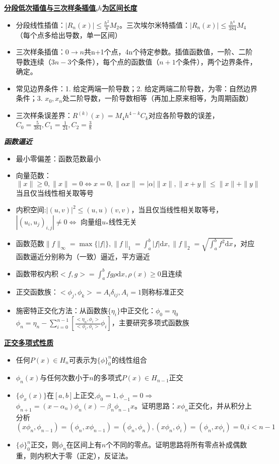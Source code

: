\documentclass[UTF8,a4paper,landscape,compress]{paper}
\renewcommand{\subsection}[1]{{\small\textbf{\underline{#1}}}\\ }
\renewcommand{\section}[1]{{\normalsize\textbf{\emph{#1}}}\\ }
\newcommand{\List}[1]{\begin{itemize}[fullwidth,itemindent=0em] #1 \end{itemize}}
\begin{document}
\begin{multicols}{4}
    \subsection{分段低次插值与三次样条插值,$h$为区间长度}
    \List{
        \item {分段线性插值：$|R_n(x)| \le \frac{h^2}{8}M_2$。三次埃尔米特插值：$|R_n(x)| \le \frac{h^4}{384}M_4$（每个点多给出导数，单一区间）}
        \item {三次样条插值：$0\rightarrow n$共n+1个点，4n个待定参数。插值函数值，一阶、二阶导数连续（$3n-3$个条件），每个点的函数值（$n + 1$个条件），两个边界条件，确定。}
        \item {常见边界条件：1. 给定两端一阶导数；2. 给定两端二阶导数，为零：自然边界条件；3. $x_0,x_n$处二阶导数，一阶导数相等（再加上原来相等，为周期函数） }
        \item {三次样条误差界：$R^{(k)}(x) = M_4 h^{4-k} C_k$对应各阶导数的误差，$C_0 = \frac{5}{384},C_1 = \frac{1}{24},C_2=\frac{3}{8}$}
    }
\section{函数逼近}
    \List{
        \item {最小零偏差：函数范数最小}
        \item {向量范数：$\|x\| \ge 0, \|x\| =0 \iff x = 0, \|\alpha x\| = |\alpha|\|x\|, \|x+y\| \le \|x\| + \|y\|$ 当且仅当线性相关取等号}
        \item {内积空间:$|(u,v)|^2 \le (u,u)(v,v)$，当且仅当线性相关取等号，$|(u_i,u_j)_{i,j}| \ne 0 \iff $ 向量组$u_*$线性无关 }
        \item {函数范数$\|f\|_\infty = \max\{|f|\}, \|f\|_1 = \int_a^b|f|\mathrm d x, \|f\|_2 = \sqrt{\int_a^bf^2\mathrm d x}$，对应函数逼近分别称为（一致）逼近，平方逼近}
        \item {函数带权内积$<f,g> = \int_a^bfg\rho\mathrm dx,\rho(x) \ge 0$且连续}
        \item {正交函数族：$<\phi_j,\phi_k> =A_{i}\delta_{ij},A_i=1$则称标准正交}
        \item {施密特正交化方法：从函数族$\{\eta_i\}$中正交化：$\phi_0 = \eta_0$\\$ \phi_n = \eta_n - \sum_{i=0}^{n-1}[\frac{<\eta_n,\phi_i>}{<\phi_i,\phi_i>}\phi_i]$，主要研究多项式函数族}
    }
    \subsection{正交多项式性质}
    \List{
        \item {任何$P(x)\in H_n$可表示为$\{\phi\}^n_0$的线性组合}
        \item {$\phi_n(x)$与任何次数小于$n$的多项式$P(x)\in H_{n-1}$正交}
        \item {$\{\phi_x(x)\}$在$[a,b]$上正交,$\phi_0 = 1,\phi_{-1} = 0 \Rightarrow$ \\ $ \phi_{n+1} = (x-\alpha_n)\phi_n(x)-\beta_n\phi_{n-1}x$。证明思路：$x\phi_n$正交化，并从积分上分析$(x\phi_n,\phi_{n-1}) = (\phi_n,x\phi_{n-1})=(\phi_n,\phi_n),(x\phi_n,\phi_{i}) = (\phi_n,x\phi_{i})=0,i < n-1$}
        \item {$\{\phi\}^n_0$正交，则$\phi_n$在区间上有$n$个不同的零点。证明思路将所有零点补成偶数重，则内积大于零（正定），反证法。}
    }

\end{multicols}
\end{document}
